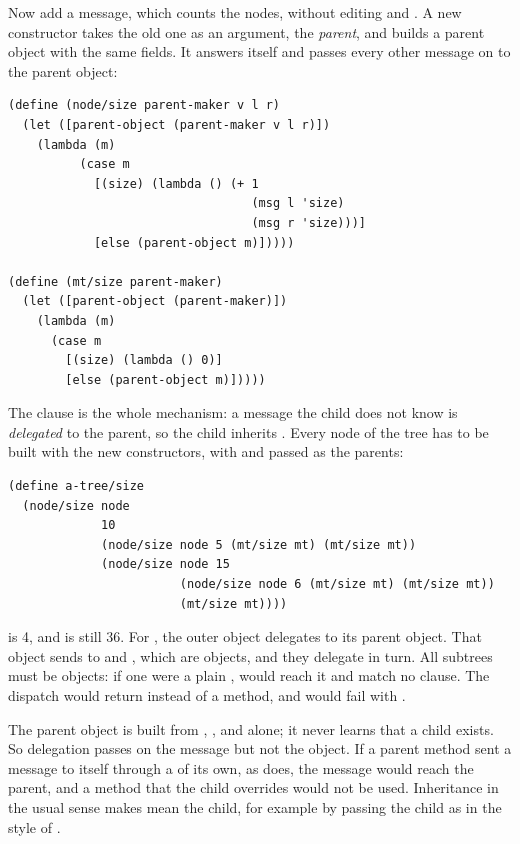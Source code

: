 Now add a  message, which counts the nodes, without editing  and . A new constructor takes the old one as an argument, the \emph{parent}, and builds a parent object with the same fields. It answers  itself and passes every other message on to the parent object:
\begin{lstlisting}
(define (node/size parent-maker v l r)
  (let ([parent-object (parent-maker v l r)])
    (lambda (m)
          (case m
            [(size) (lambda () (+ 1
                                  (msg l 'size)
                                  (msg r 'size)))]
            [else (parent-object m)]))))

(define (mt/size parent-maker)
  (let ([parent-object (parent-maker)])
    (lambda (m)
      (case m
        [(size) (lambda () 0)]
        [else (parent-object m)]))))
\end{lstlisting}
The  clause is the whole mechanism: a message the child does not know is \emph{delegated} to the parent, so the child inherits . Every node of the tree has to be built with the new constructors, with  and  passed as the parents:
\begin{lstlisting}
(define a-tree/size
  (node/size node
             10
             (node/size node 5 (mt/size mt) (mt/size mt))
             (node/size node 15
                        (node/size node 6 (mt/size mt) (mt/size mt))
                        (mt/size mt))))
\end{lstlisting}
 is 4, and  is still 36. For , the outer  object delegates to its parent  object. That object sends  to  and , which are  objects, and they delegate in turn. All subtrees must be  objects: if one were a plain ,  would reach it and match no  clause. The dispatch would return  instead of a method, and  would fail with .

\begin{remark}
The parent object is built from , , and  alone; it never learns that a child exists. So delegation passes on the message but not the object. If a parent method sent a message to itself through a  of its own, as  does, the message would reach the parent, and a method that the child overrides would not be used. Inheritance in the usual sense makes  mean the child, for example by passing the child as  in the style of .
\end{remark}
